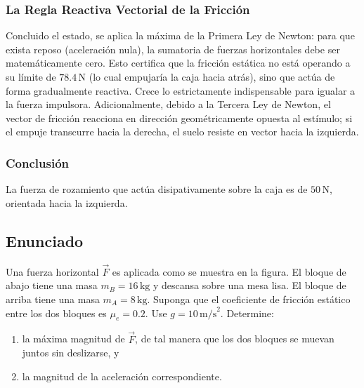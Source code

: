 \documentclass[12pt]{article}
\begin{document}
\subsubsection*{La Regla Reactiva Vectorial de la Fricción}
Concluido el estado, se aplica la máxima de la Primera Ley de Newton: para que exista reposo (aceleración nula), la sumatoria de fuerzas horizontales debe ser matemáticamente cero. Esto certifica que la fricción estática no está operando a su límite de $78.4 \, \text{N}$ (lo cual empujaría la caja hacia atrás), sino que actúa de forma gradualmente reactiva. Crece lo estrictamente indispensable para igualar a la fuerza impulsora. 
Adicionalmente, debido a la Tercera Ley de Newton, el vector de fricción reacciona en dirección geométricamente opuesta al estímulo; si el empuje transcurre hacia la derecha, el suelo resiste en vector hacia la izquierda.

\subsubsection*{Conclusión}
La fuerza de rozamiento que actúa disipativamente sobre la caja es de $50 \, \text{N}$, orientada hacia la izquierda.

\newpage

\subsection*{Enunciado}
Una fuerza horizontal $\vec{F}$ es aplicada como se muestra en la figura. El bloque de abajo tiene una masa $m_B = 16 \, \text{kg}$ y descansa sobre una mesa lisa. El bloque de arriba tiene una masa $m_A = 8 \, \text{kg}$. Suponga que el coeficiente de fricción estático entre los dos bloques es $\mu_e = 0.2$. Use $g = 10 \, \text{m/s}^2$. Determine:
\begin{enumerate}
    \item[a)] la máxima magnitud de $\vec{F}$, de tal manera que los dos bloques se muevan juntos sin deslizarse, y
    \item[b)] la magnitud de la aceleración correspondiente.
\end{enumerate}

\begin{center}
\end{center}
\end{document}

